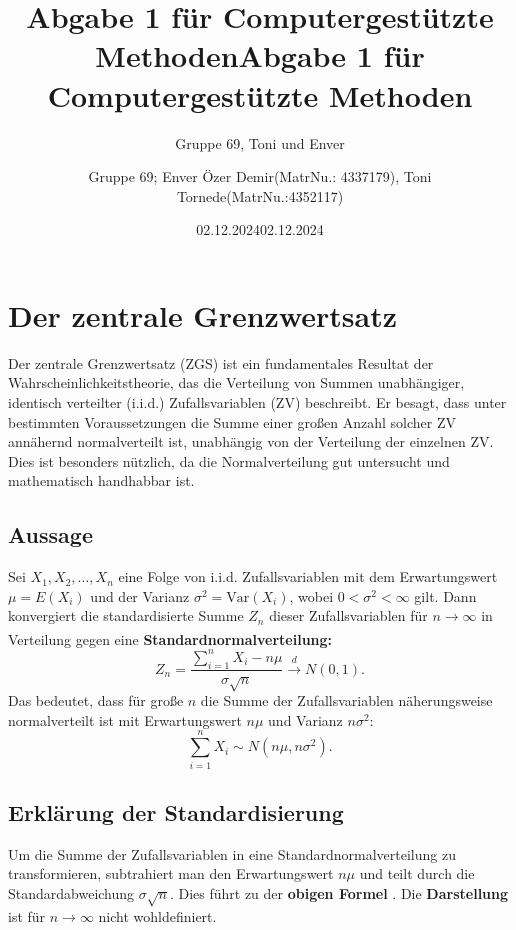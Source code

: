 \documentclass{article}
\title{Abgabe 1 für Computergestützte Methoden}
\author{Gruppe 69, Toni und Enver }
\date{02.12.2024}
\title{Abgabe 1 für Computergestützte Methoden}
\author{Gruppe 69; Enver Özer Demir(MatrNu.: 4337179),
Toni Tornede(MatrNu.:4352117)}
\date{02.12.2024}
\newcommand{\redboxlink}[2]{\textsuperscript{\hyperlink{#1}{\fbox{\textcolor{red}{#2}}}}}
\begin{document}
\maketitle
\tableofcontents
\newpage


\section{Der zentrale Grenzwertsatz}
\label{sec:zgs}

Der zentrale Grenzwertsatz (ZGS) ist ein fundamentales Resultat der Wahrscheinlichkeitstheorie, das die Verteilung von Summen unabhängiger, identisch verteilter (i.i.d.) Zufallsvariablen (ZV) beschreibt. Er besagt, dass unter bestimmten Voraussetzungen die Summe einer großen Anzahl solcher ZV annähernd normalverteilt ist, unabhängig von der Verteilung der einzelnen ZV. Dies ist besonders nützlich, da die Normalverteilung gut untersucht und mathematisch handhabbar ist.

\subsection{Aussage}
Sei $X_1, X_2, \dots, X_n$ eine Folge von i.i.d. Zufallsvariablen mit dem Erwartungswert $\mu = E(X_i)$ und der Varianz $\sigma^2 = \text{Var}(X_i)$, wobei $0 < \sigma^2 < \infty$ gilt. Dann konvergiert die standardisierte Summe $Z_n$ dieser Zufallsvariablen für $n \to \infty$ in Verteilung gegen eine \textbf{Standardnormalverteilung:}\redboxlink{zgs1}{1} 
\begin{equation}
Z_n = \frac{\sum_{i=1}^n X_i - n\mu}{\sigma \sqrt{n}} \overset{d}{\to} N(0,1). \tag{1}
\end{equation}
Das bedeutet, dass für große $n$ die Summe der Zufallsvariablen näherungsweise normalverteilt ist mit Erwartungswert $n\mu$ und Varianz $n\sigma^2$:
\begin{equation}
\sum_{i=1}^n X_i \sim N(n\mu, n\sigma^2). \tag{2}
\end{equation}

\subsection{Erklärung der Standardisierung}
\label{zgs1}
Um die Summe der Zufallsvariablen in eine Standardnormalverteilung zu transformieren, subtrahiert man den Erwartungswert $n\mu$ und teilt durch die Standardabweichung $\sigma \sqrt{n}$. Dies führt zu der \textbf{obigen Formel} \hyperlink{zgs1}{\fbox{\textcolor{red}{(1)}}}. Die \textbf{Darstellung} \hyperlink{zgs2}{\fbox{\textcolor{red}{(2)}}} ist für $n \to \infty$ nicht wohldefiniert.
\end{document}
